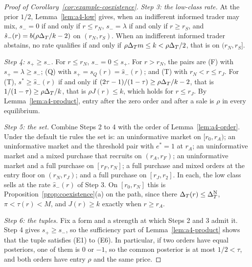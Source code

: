 \begin{proof}[Proof of Corollary~\ref{cor:example-coexistence}]
\emph{Step 3: the low-class rate.} At the prior \(1/2\), Lemma~\ref{lem:a4-low} gives, when an indifferent informed trader
may mix, \(s_-=0\) if and only if \(r\le r_N\), \(s_-=\lambda\) if and only if \(r\ge r_S\), and
\(\hat s_-(r)=b(\rho\Delta_T/k-2)\) on \((r_N,r_S)\). When an indifferent informed trader abstains, no rate qualifies if and only
if \(\rho\Delta_T m\le k<\rho\Delta_T/2\), that is on \((r_N,r_S]\).

\emph{Step 4: \(s_+\ge s_-\).} For \(r\le r_N\), \(s_-=0\le s_+\). For \(r>r_N\), the pairs are (F) with
\(s_+=\lambda\ge s_-\); (Q) with \(s_+=s_Q(r)=\hat s_-(r)\); and (T) with \(r_N<r\le r_J\). For (T),
\(s^*\ge\hat s_-(r)\) if and only if \((2\tau-1)/(1-\tau)\ge\rho\Delta_T/k-2\), that is \(1/(1-\tau)\ge\rho\Delta_T/k\), that is
\(\rho J(r)\le k\), which holds for \(r\le r_J\). By Lemma~\ref{lem:a4-product}, entry after the zero order and after
a sale is \(\rho\) in every equilibrium.

\emph{Step 5: the set.} Combine Steps 2 to 4 with the order of Lemma~\ref{lem:a4-order}. Under the default tie rules
the set is: an uninformative market on \([r_0,r_A)\); an uninformative market and the threshold pair with \(e^*=1\) at \(r_A\); an uninformative
market and a mixed purchase that recruits on \((r_A,r_F)\); an uninformative market and a full purchase on \([r_F,r_N]\); a full
purchase and mixed orders at the entry floor on \((r_N,r_J)\); and a full purchase on \([r_J,r_2]\). In each, the low
class sells at the rate \(\hat s_-(r)\) of Step 3. On \([r_0,r_N]\) this is Proposition~\ref{prop:coexistence}(a) on the
path, since there \(\Delta_T(r)\le\Delta_T^{\rm N}\), \(\pi<\tau(r)<M\), and \(J(r)\ge k\) exactly when \(r\ge r_A\).

\emph{Step 6: the tuples.} Fix a form and a strength at which Steps 2 and 3 admit it. Step 4 gives \(s_+\ge s_-\), so
the sufficiency part of Lemma~\ref{lem:a4-product} shows that the tuple satisfies (E1) to (E6). In particular, if two
orders have equal posteriors, one of them is \(0\) or \(-1\), so the common posterior is at most \(1/2<\tau\), and both
orders have entry \(\rho\) and the same price.


\end{proof}
